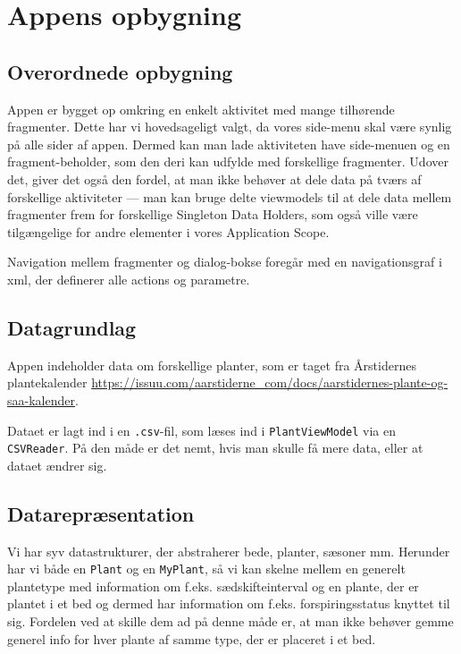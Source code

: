 \section{Appens opbygning}

\subsection{Overordnede opbygning}
Appen er bygget op omkring en enkelt aktivitet med mange tilhørende fragmenter. Dette har vi hovedsageligt valgt, da vores side-menu skal være synlig på alle sider af appen. Dermed kan man lade aktiviteten have side-menuen og en fragment-beholder, som den deri kan udfylde med forskellige fragmenter. Udover det, giver det også den fordel, at man ikke behøver at dele data på tværs af forskellige aktiviteter --- man kan bruge delte viewmodels til at dele data mellem fragmenter frem for forskellige Singleton Data Holders, som også ville være tilgængelige for andre elementer i vores Application Scope.

Navigation mellem fragmenter og dialog-bokse foregår med en navigationsgraf i xml, der definerer alle actions og parametre.

\subsection{Datagrundlag}
Appen indeholder data om forskellige planter, som er taget fra Årstidernes plantekalender \hyperlink{https://issuu.com/aarstiderne\_com/docs/aarstidernes-plante-og-saa-kalender}{https://issuu.com/aarstiderne\_com/docs/aarstidernes-plante-og-saa-kalender}.

Dataet er lagt ind i en \texttt{.csv}-fil, som læses ind i \texttt{PlantViewModel} via en \texttt{CSVReader}. På den måde er det nemt, hvis man skulle få mere data, eller at dataet ændrer sig. 

\subsection{Datarepræsentation}

Vi har syv datastrukturer, der abstraherer bede, planter, sæsoner mm. Herunder har vi både en \texttt{Plant} og en \texttt{MyPlant}, så vi kan skelne mellem en generelt plantetype med information om f.eks. sædskifteinterval og en plante, der er plantet i et bed og dermed har information om f.eks. forspiringsstatus knyttet til sig. Fordelen ved at skille dem ad på denne måde er, at man ikke behøver gemme generel info for hver plante af samme type, der er placeret i et bed.

